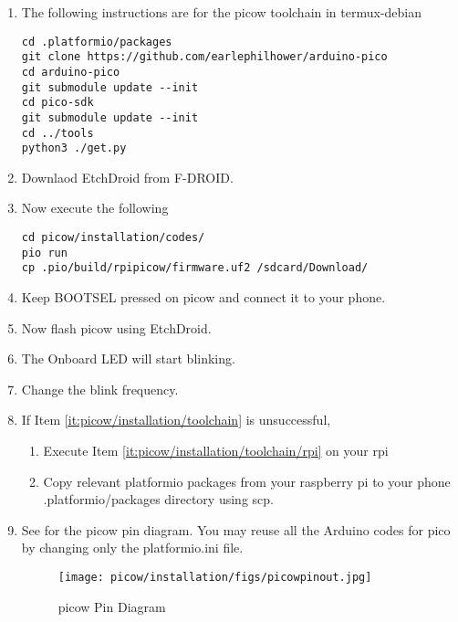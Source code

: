 \begin{enumerate}[label=\arabic*.,ref=\theenumi]
	\item The following instructions are for the picow toolchain
		in termux-debian
		\label{it:picow/installation/toolchain}
\begin{lstlisting}
cd .platformio/packages
git clone https://github.com/earlephilhower/arduino-pico
cd arduino-pico
git submodule update --init
cd pico-sdk
git submodule update --init
cd ../tools
python3 ./get.py
\end{lstlisting}
\item Downlaod EtchDroid from F-DROID. 
\item Now execute the following 
\label{it:picow/installation/toolchain/rpi}
\begin{lstlisting}
cd picow/installation/codes/
pio run
cp .pio/build/rpipicow/firmware.uf2 /sdcard/Download/
\end{lstlisting}
\item  Keep BOOTSEL pressed on picow  and connect it to your phone.
\item Now flash picow using EtchDroid.
\item The Onboard LED will start blinking.
\item Change the blink frequency.
\item If Item \ref{it:picow/installation/toolchain} is unsuccessful, 
\begin{enumerate}
	\item
		Execute Item
\ref{it:picow/installation/toolchain/rpi}
on your rpi
	\item Copy relevant platformio packages from your raspberry pi to your phone .platformio/packages directory using scp.
\end{enumerate}
\item 
	See
			 for the picow pin diagram.
			You may reuse all the Arduino codes for pico by changing only the platformio.ini file.
		\begin{figure}
			\centering
    \texttt{[image: picow/installation/figs/picowpinout.jpg]}
    \caption{picow Pin Diagram} %
			\label{fig:picowpinout}
		\end{figure}
\end{enumerate}





